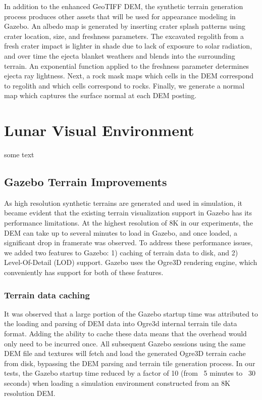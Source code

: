 \documentclass[twocolumn,letterpaper]{IEEEAerospaceCLS}  %
\begin{document}
In addition to the enhanced GeoTIFF DEM, the synthetic terrain generation process produces other assets that will be used for appearance modeling in Gazebo. An albedo map is generated by inserting crater splash patterns using crater location, size, and freshness parameters. The excavated regolith from a fresh crater impact is lighter in shade due to lack of exposure to solar radiation, and over time the ejecta blanket weathers and blends into the surrounding terrain. An exponential function applied to the freshness parameter determines ejecta ray lightness. Next, a rock mask maps which cells in the DEM correspond to regolith and which cells correspond to rocks. Finally, we generate a normal map which captures the surface normal at each DEM posting. 



\section{Lunar Visual Environment}
some text

\subsection{Gazebo Terrain Improvements}

As high resolution synthetic terrains are generated and used in simulation, it became evident that the existing terrain visualization support in Gazebo has its performance limitations. At the highest resolution of 8K in our experiments, the DEM can take up to several minutes to load in Gazebo, and once loaded, a significant drop in framerate was observed. To address these performance issues, we added two features to Gazebo: 1) caching of terrain data to disk, and 2) Level-Of-Detail (LOD) support. Gazebo uses the Ogre3D rendering engine, which conveniently has support for both of these features. 

\subsubsection{Terrain data caching}

It was observed that a large portion of the Gazebo startup time was attributed to the loading and parsing of DEM data into Ogre3d internal terrain tile data format. Adding the ability to cache these data means that the overhead would only need to be incurred once. All subsequent Gazebo sessions using the same DEM file and textures will fetch and load the generated Ogre3D terrain cache from disk, bypassing the DEM parsing and terrain tile generation process. In our tests, the Gazebo startup time reduced by a factor of 10 (from ~5 minutes to ~30 seconds) when loading a simulation environment constructed from an 8K resolution DEM.
\end{document}
